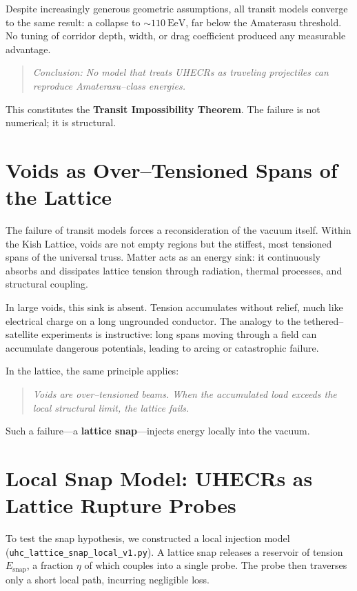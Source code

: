 \documentclass[11pt, letterpaper, openany]{book}
\begin{document}
Despite increasingly generous geometric assumptions, all transit models converge
to the same result: a collapse to $\sim 110~\mathrm{EeV}$, far below the
Amaterasu threshold. No tuning of corridor depth, width, or drag coefficient
produced any measurable advantage.

\begin{quote}
\textit{Conclusion: No model that treats UHECRs as traveling projectiles can
reproduce Amaterasu–class energies.}
\end{quote}

This constitutes the \textbf{Transit Impossibility Theorem}. The failure is not
numerical; it is structural.

\section{Voids as Over–Tensioned Spans of the Lattice}

The failure of transit models forces a reconsideration of the vacuum itself.
Within the Kish Lattice, voids are not empty regions but the stiffest, most
tensioned spans of the universal truss. Matter acts as an energy sink: it
continuously absorbs and dissipates lattice tension through radiation, thermal
processes, and structural coupling.

In large voids, this sink is absent. Tension accumulates without relief, much
like electrical charge on a long ungrounded conductor. The analogy to the
tethered–satellite experiments is instructive: long spans moving through a field
can accumulate dangerous potentials, leading to arcing or catastrophic failure.

In the lattice, the same principle applies:

\begin{quote}
\textit{Voids are over–tensioned beams. When the accumulated load exceeds the
local structural limit, the lattice fails.}
\end{quote}

Such a failure---a \textbf{lattice snap}---injects energy locally into the
vacuum.

\section{Local Snap Model: UHECRs as Lattice Rupture Probes}

To test the snap hypothesis, we constructed a local injection model
(\texttt{uhc\_lattice\_snap\_local\_v1.py}). A lattice snap releases a reservoir
of tension $E_{\mathrm{snap}}$, a fraction $\eta$ of which couples into a single
probe. The probe then traverses only a short local path, incurring negligible
loss.
\end{document}
